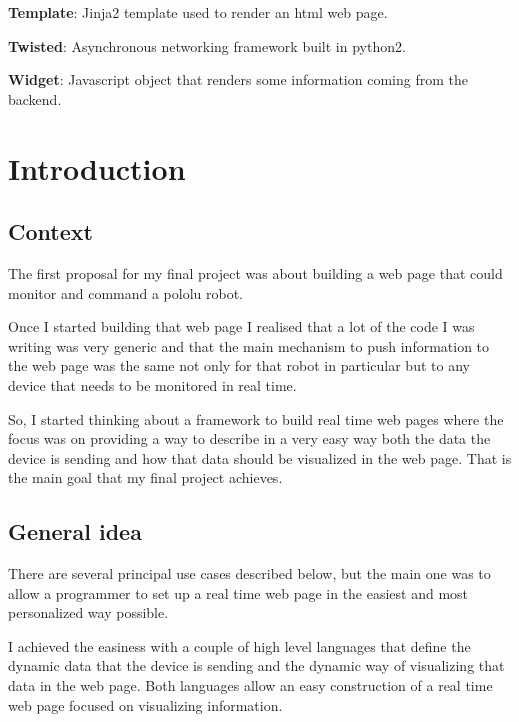\documentclass[12pt]{article}
\begin{document}
            \textbf{Template}: Jinja2 template used to render an html
                web page.

            \textbf{Twisted}: Asynchronous networking framework built
                in python2.

            \textbf{Widget}: Javascript object that renders some
                information coming from the backend.

            \setlength{\parindent}{1cm}

        \newpage
        \section{Introduction}
        \subsection{Context}
            The first proposal for my final project was about building a web
            page that could monitor and command a pololu robot.

            Once I started building that web page I realised that a lot of the
            code I was writing was very generic and that the main mechanism to
            push information to the web page was the same not only for that
            robot in particular but to any device that needs to be monitored in
            real time.

            So, I started thinking about a framework to build real time web
            pages where the focus was on providing a way to describe in a very
            easy way both the data the device is sending and how that data
            should be visualized in the web page. That is the main goal that my
            final project achieves.

        \subsection{General idea}
            There are several principal use cases described below, but the main
            one was to allow a programmer to set up a real time web page in the
            easiest and most personalized way possible.

            I achieved the easiness with a couple of high level languages that
            define the dynamic data that the device is sending and the dynamic
            way of visualizing that data in the web page. Both languages allow
            an easy construction of a real time web page focused on visualizing
            information.
\end{document}
